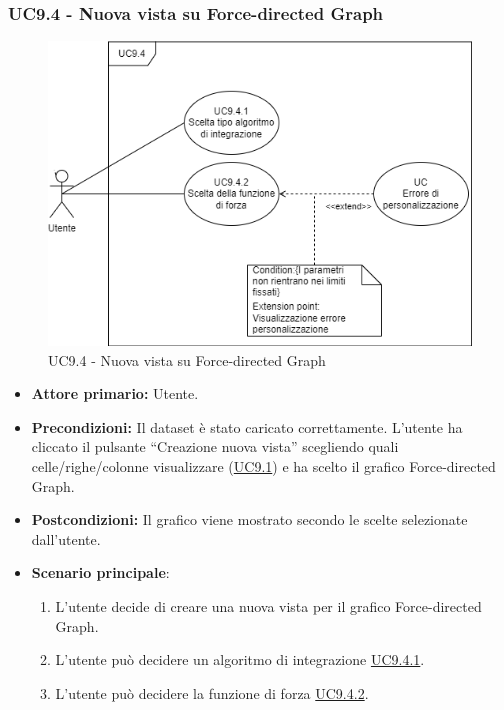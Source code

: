 \subsubsection{UC9.4 - Nuova vista su Force-directed Graph}
\label{sec:UC9.4}
\begin{figure}[h!]
	\centering
	\includegraphics[scale=0.55]{../../assets/creazionevista_force.png}
	\caption{UC9.4 - Nuova vista su Force-directed Graph}
\end{figure}
\begin{itemize}
    \item \textbf{Attore primario:} Utente.
    \item \textbf{Precondizioni:} Il dataset è stato caricato correttamente. L'utente ha cliccato il pulsante ``Creazione nuova vista'' scegliendo quali celle/righe/colonne visualizzare (\hyperref[sec:UC9.1]{UC9.1}) e ha scelto il grafico Force-directed Graph.
    \item \textbf{Postcondizioni:} Il grafico viene mostrato secondo le scelte selezionate dall'utente.
    \item \textbf{Scenario principale}:
    \begin{enumerate}
		\item L'utente decide di creare una nuova vista per il grafico Force-directed Graph.
		\item L'utente può decidere un algoritmo di integrazione \hyperref[sec:UC9.4.1]{UC9.4.1}.
		\item L'utente può decidere la funzione di forza \hyperref[sec:UC9.4.2]{UC9.4.2}.
	\end{enumerate}
\end{itemize}


